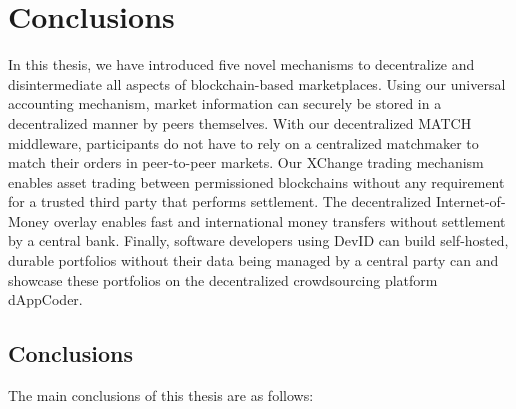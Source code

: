 \chapter{Conclusions}
\label{conclusion}

In this thesis, we have introduced five novel mechanisms to decentralize and disintermediate all aspects of blockchain-based marketplaces.
Using our universal \TrustChain{} accounting mechanism, market information can securely be stored in a decentralized manner by peers themselves.
With our decentralized MATCH middleware, participants do not have to rely on a centralized matchmaker to match their orders in peer-to-peer markets.
Our XChange trading mechanism enables asset trading between permissioned blockchains without any requirement for a trusted third party that performs settlement.
The decentralized Internet-of-Money overlay enables fast and international money transfers without settlement by a central bank.
Finally, software developers using DevID can build self-hosted, durable portfolios without their data being managed by a central party can and showcase these portfolios on the decentralized crowdsourcing platform dAppCoder.

\section{Conclusions}
The main conclusions of this thesis are as follows:

